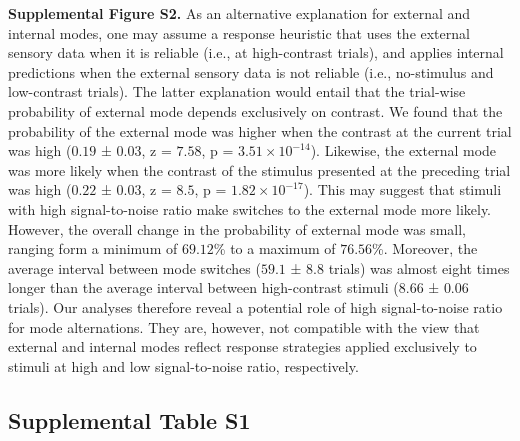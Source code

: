 \documentclass[
]{article}
\begin{document}
\textbf{Supplemental Figure S2.} As an alternative explanation for
external and internal modes, one may assume a response heuristic that
uses the external sensory data when it is reliable (i.e., at
high-contrast trials), and applies internal predictions when the
external sensory data is not reliable (i.e., no-stimulus and
low-contrast trials). The latter explanation would entail that the
trial-wise probability of external mode depends exclusively on contrast.
We found that the probability of the external mode was higher when the
contrast at the current trial was high (\(0.19\) ± \(0.03\), z =
\(7.58\), p = \(\ensuremath{3.51\times 10^{-14}}\)). Likewise, the
external mode was more likely when the contrast of the stimulus
presented at the preceding trial was high (\(0.22\) ± \(0.03\), z =
\(8.5\), p = \(\ensuremath{1.82\times 10^{-17}}\)). This may suggest
that stimuli with high signal-to-noise ratio make switches to the
external mode more likely. However, the overall change in the
probability of external mode was small, ranging form a minimum of
\(69.12\)\% to a maximum of \(76.56\)\%. Moreover, the average interval
between mode switches (\(59.1\) ± \(8.8\) trials) was almost eight times
longer than the average interval between high-contrast stimuli (\(8.66\)
± \(0.06\) trials). Our analyses therefore reveal a potential role of
high signal-to-noise ratio for mode alternations. They are, however, not
compatible with the view that external and internal modes reflect
response strategies applied exclusively to stimuli at high and low
signal-to-noise ratio, respectively.

\newpage

\hypertarget{supplemental-table-s1}{%
\subsection{Supplemental Table S1}\label{supplemental-table-s1}}
\end{document}
